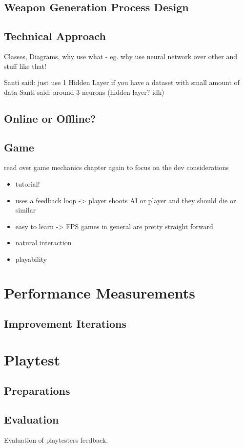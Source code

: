 \documentclass[MGS,Master,english]{twbook}%
\begin{document}
\subsection{Weapon Generation Process Design}

\subsection{Technical Approach}
Classes, Diagrams, why use what - eg. why use neural network over other and stuff like that!

Santi said: just use 1 Hidden Layer if you have a dataset with small amount of data
Santi said: around 3 neurons (hidden layer? idk)
\subsection{Online or Offline?}
\subsection{Game}
read over game mechanics chapter again to focus on the dev considerations
\begin{itemize}
	\item tutorial!
	\item uses a feedback loop -> player shoots AI or player and they should die or similar
	\item easy to learn -> FPS games in general are pretty straight forward
	\item natural interaction
	\item playability	
\end{itemize}
\section{Performance Measurements}
\subsection{Improvement Iterations}
\section{Playtest}
\subsection{Preparations}
\subsection{Evaluation}
Evaluation of playtesters feedback.
\end{document}
